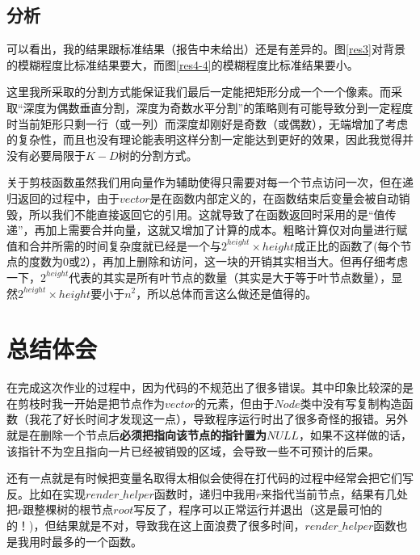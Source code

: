\documentclass[UTF8]{ctexart}
\begin{document}



	\subsection{分析}\label{time_of_PrintLots}
	\indent 可以看出，我的结果跟标准结果（报告中未给出）还是有差异的。图\ref{res3}对背景的模糊程度比标准结果要大，而图\ref{res4-4}的模糊程度比标准结果要小。
	
	\indent 这里我所采取的分割方式能保证我们最后一定能把矩形分成一个一个像素。而采取“深度为偶数垂直分割，深度为奇数水平分割”的策略则有可能导致分到一定程度时当前矩形只剩一行（或一列）而深度却刚好是奇数（或偶数），无端增加了考虑的复杂性，而且也没有理论能表明这样分割一定能达到更好的效果，因此我觉得并没有必要局限于$K-D$树的分割方式。
	
	\indent 关于剪枝函数虽然我们用向量作为辅助使得只需要对每一个节点访问一次，但在递归返回的过程中，由于$vector$是在函数内部定义的，在函数结束后变量会被自动销毁，所以我们不能直接返回它的引用。这就导致了在函数返回时采用的是“值传递”，再加上需要合并向量，这就又增加了计算的成本。粗略计算仅对向量进行赋值和合并所需的时间复杂度就已经是一个与$2^{height}\times height$成正比的函数了(每个节点的度数为$0$或$2$），再加上删除和访问，这一块的开销其实相当大。但再仔细考虑一下，$2^{height}$代表的其实是所有叶节点的数量（其实是大于等于叶节点数量），显然$2^{height}\times height$要小于$n^2$，所以总体而言这么做还是值得的。
		

	\section{总结体会}
	\indent 在完成这次作业的过程中，因为代码的不规范出了很多错误。其中印象比较深的是在剪枝时我一开始是把节点作为$vector$的元素，但由于$Node$类中没有写复制构造函数（我花了好长时间才发现这一点），导致程序运行时出了很多奇怪的报错。另外就是在删除一个节点后\textbf{必须把指向该节点的指针置为$NULL$}，如果不这样做的话，该指针不为空且指向一片已经被销毁的区域，会导致一些不可预计的后果。
	
	\indent 还有一点就是有时候把变量名取得太相似会使得在打代码的过程中经常会把它们写反。比如在实现$render\_helper$函数时，递归中我用$r$来指代当前节点，结果有几处把$r$跟整棵树的根节点$root$写反了，程序可以正常运行并退出（\textcolor[rgb]{1,0,0}{这是最可怕的的！})，但结果就是不对，导致我在这上面浪费了很多时间，$render\_helper$函数也是我用时最多的一个函数。


\end{document}
